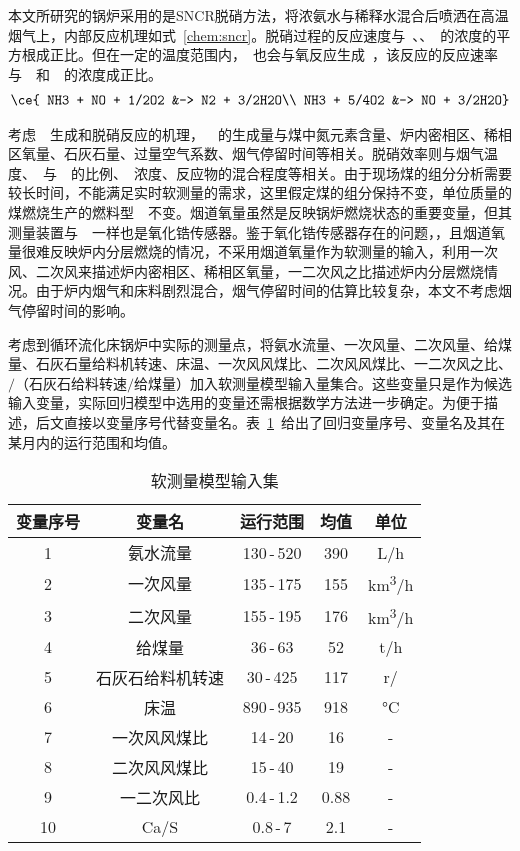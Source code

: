 本文所研究的锅炉采用的是SNCR脱硝方法，将浓氨水与稀释水混合后喷洒在高温烟气上，内部反应机理如式~\ref{chem:sncr}。脱硝过程的反应速度与~、、~的浓度的平方根成正比。但在一定的温度范围内，~也会与氧反应生成~，该反应的反应速率与~~和~~的浓度成正比。
\begin{align}
\label{chem:sncr}
\begin{split}
\ce{
NH3 + NO + 1/2O2 &-> N2 + 3/2H2O\\
NH3 + 5/4O2 &-> NO + 3/2H2O}
\end{split}
\end{align}

考虑~~生成和脱硝反应的机理，~~的生成量与煤中氮元素含量、炉内密相区、稀相区氧量、石灰石量、过量空气系数、烟气停留时间等相关。脱硝效率则与烟气温度、~与~~的比例、~浓度、反应物的混合程度等相关。由于现场煤的组分分析需要较长时间，不能满足实时软测量的需求，这里假定煤的组分保持不变，单位质量的煤燃烧生产的燃料型~~不变。烟道氧量虽然是反映锅炉燃烧状态的重要变量，但其测量装置与~~一样也是氧化锆传感器。鉴于氧化锆传感器存在的问题，，且烟道氧量很难反映炉内分层燃烧的情况，不采用烟道氧量作为软测量的输入，利用一次风、二次风来描述炉内密相区、稀相区氧量，一二次风之比描述炉内分层燃烧情况。由于炉内烟气和床料剧烈混合，烟气停留时间的估算比较复杂，本文不考虑烟气停留时间的影响。

考虑到循环流化床锅炉中实际的测量点，将氨水流量、一次风量、二次风量、给煤量、石灰石量给料机转速、床温、一次风风煤比、二次风风煤比、一二次风之比、$/$（石灰石给料转速$/$给煤量）加入软测量模型输入量集合。这些变量只是作为候选输入变量，实际回归模型中选用的变量还需根据数学方法进一步确定。为便于描述，后文直接以变量序号代替变量名。表~\ref{tab:nox_input}~给出了回归变量序号、变量名及其在某月内的运行范围和均值。

\begingroup
\renewcommand*{\arraystretch}{1.67}
\begin{table}[!h]
\small
\centering
\caption[软测量模型输入集]{软测量模型输入集} \label{tab:nox_input}
\begin{tabular}{ccccc}
\hline\hline 
变量序号	&变量名	&运行范围	&均值	&单位\\
\hline
1	&氨水流量&	130$\,$-$\,$520&	390	&\si{L/h}\\
2	&一次风量&135$\,$-$\,$175	&155	&\si{km^3/h}\\
3	&二次风量&	155$\,$-$\,$195	&176	&\si{km^3/h}\\
4	&给煤量	&36$\,$-$\,$63	&52	&\si{t/h}\\
5	&石灰石给料机转速	&30$\,$-$\,$425	&117	&\si{r/\min}\\
6	&床温	&890$\,$-$\,$935	&918	&\si{\degreeCelsius}\\
7	&一次风风煤比	&14$\,$-$\,$20	&16	&-\\
8	&二次风风煤比	&15$\,$-$\,$40	&19	&-\\
9	&一二次风比&	0.4$\,$-$\,$1.2	&0.88	&-\\
10	&Ca/S	&0.8$\,$-$\,$7	&2.1	&-\\
\hline\hline
\end{tabular}
\end{table}
\endgroup

